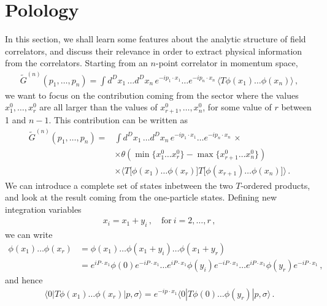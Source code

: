 \section{Polology}
\label{sec:polology}

In this section, we shall learn some features about the analytic
structure of field correlators, and discuss their relevance in order
to extract physical information from the correlators. Starting from an
$n$-point correlator in momentum space,
\begin{align}
  \tilde{G}^{(n)}\left(p_1, \ldots, p_n\right) 
  = \int d^Dx_1\, \ldots d^Dx_n\, 
  e^{-i p_1\cdot x_1} \ldots e^{-i p_n\cdot x_n}\, 
  \langle T\phi(x_1) \ldots \phi(x_n)\rangle\, ,
\end{align}
we want to focus on the contribution coming from the sector where the
values $x_1^0, \ldots, x_r^0$ are all larger than the values of
$x_{r+1}^0, \ldots, x_n^0$, for some value of $r$ between 1 and
$n-1$. This contribution can be written as 
\begin{align}
  \tilde{G}^{(n)}\left(p_1, \ldots, p_n\right) 
  =& \int d^Dx_1\, \ldots d^Dx_n\, 
  e^{-i p_1\cdot x_1} \ldots e^{-i p_n\cdot x_n}\, \times \nonumber \\
   &\times \theta\left(
     \min\{x_1^0 \ldots x_r^0\} - \max\{x_{r+1}^0 \ldots x_n^0\}
     \right) \nonumber \\
   &\times \langle T\Big[\phi(x_1) \ldots \phi(x_r)\Big]
     T\Big[\phi(x_{r+1}) \ldots \phi(x_n)\Big]
     \rangle\, .
\end{align}
We can introduce a complete set of states inbetween the two
$T$-ordered products, and look at the result coming from the
one-particle states. Defining new integration variables
\begin{align}
  x_i = x_1 + y_i\, , \quad \mathrm{for}\ i=2, \ldots, r\, ,
\end{align}
we can write
\begin{align}
  \phi(x_1) \ldots \phi(x_r) 
  &= \phi(x_1) \ldots \phi(x_1+y_i) \ldots \phi(x_1+y_r) \nonumber \\
  &= e^{i P\cdot x_1} \phi(0) e^{-i P\cdot x_1} \ldots e^{i P\cdot
    x_1} \phi(y_i) e^{-i P\cdot x_1} \ldots e^{i P\cdot x_1} \phi(y_r)
    e^{-i P\cdot x_1}\, ,
\end{align}
and hence
\begin{align}
  \langle 0| T \phi(x_1) \ldots \phi(x_r) | p,\sigma\rangle = 
  e^{-i p \cdot x_1}  \langle 0| T \phi(0) \ldots \phi(y_r) |
  p,\sigma\rangle\, .
\end{align}
